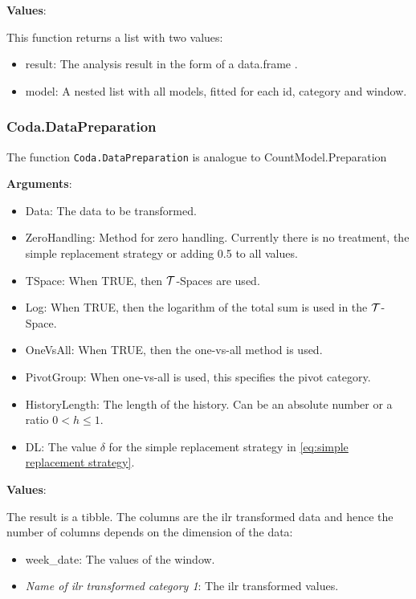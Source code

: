 \textbf{Values}:

This function returns a list with two values:

\begin{itemize}
	\item result: The analysis result in the form of a data.frame . 
	\item model: A nested list with all models, fitted for each id, category and window.
\end{itemize}

\subsubsection{Coda.DataPreparation}
\label{sec:Coda.DataPreparation}

The function \texttt{Coda.DataPreparation} is analogue to CountModel.Preparation

\textbf{Arguments}:
\begin{itemize}
  \item Data: The data to be transformed.
  \item ZeroHandling: Method for zero handling.  Currently there is no treatment, the simple replacement strategy or adding 0.5 to all values. 
  \item TSpace: When TRUE, then $\mathcal{T}$-Spaces are used.
  \item Log: When TRUE, then the logarithm of the total sum is used in the $\mathcal{T}$-Space.
  \item OneVsAll: When TRUE, then the one-vs-all method is used.
  \item PivotGroup: When one-vs-all is used, this specifies the pivot category.
  \item HistoryLength: The length of the history. Can be an absolute number or a ratio $0<h\leq 1$.
	\item DL: The value $\delta$ for the simple replacement strategy in \ref{eq:simple replacement strategy}. 
\end{itemize}

\textbf{Values}:

The result is a tibble. The columns are the ilr transformed data and hence the number of columns depends on the dimension of the data:

\begin{itemize}
	\item week\_date: The values of the window.
	\item \textit{Name of ilr transformed category 1}: The ilr transformed values.
\end{itemize}

